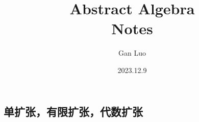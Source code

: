 \documentclass{report}
\title{\Huge{Abstract Algebra}\\Notes}
\author{\huge{Gan Luo}}
\date{2023.12.9}
\begin{document}
\maketitle
\newpage%
\tableofcontents
\pagebreak

\chapter{}
\section{单扩张，有限扩张，代数扩张}
\end{document}
